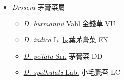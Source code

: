 
  \begin{itemize}
 \item[] \textit{Drosera} 茅膏菜屬
                                
  \begin{itemize}
        \item[] \href{http://www.theplantlist.org/tpl1.1/search?q=Drosera+burmannii}{\textit{D. burmannii} Vahl}   金錢草   VU
        \item[] \href{http://www.theplantlist.org/tpl1.1/search?q=Drosera+indica}{\textit{D. indica} L.}   長葉茅膏菜   EN
        \item[] \href{http://www.theplantlist.org/tpl1.1/search?q=Drosera+peltata}{\textit{D. peltata} Sm.}   茅膏菜   DD
        \item[] \href{http://www.theplantlist.org/tpl1.1/search?q=Drosera+spathulata}{\textit{D. spathulata} Lab.}   小毛氈苔   LC
  \end{itemize}
  \end{itemize}
